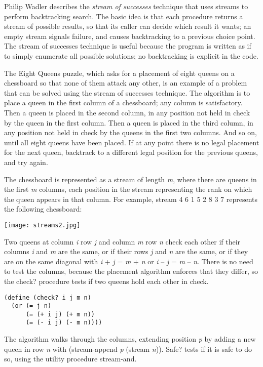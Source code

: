 Philip Wadler describes the \emph{stream of successes} technique that
uses streams to perform backtracking search. The basic idea is that each
procedure returns a stream of possible results, so that its caller can
decide which result it wants; an empty stream signals failure, and
causes backtracking to a previous choice point. The stream of successes
technique is useful because the program is written as if to simply
enumerate all possible solutions; no backtracking is explicit in the
code.

The Eight Queens puzzle, which asks for a placement of eight queens on a
chessboard so that none of them attack any other, is an example of a
problem that can be solved using the stream of successes technique. The
algorithm is to place a queen in the first column of a chessboard; any
column is satisfactory. Then a queen is placed in the second column, in
any position not held in check by the queen in the first column. Then a
queen is placed in the third column, in any position not held in check
by the queens in the first two columns. And so on, until all eight
queens have been placed. If at any point there is no legal placement for
the next queen, backtrack to a different legal position for the previous
queens, and try again.

The chessboard is represented as a stream of length \emph{m}, where
there are queens in the first \emph{m} columns, each position in the
stream representing the rank on which the queen appears in that column.
For example, stream 4 6 1 5 2 8 3 7 represents the following chessboard:

\texttt{[image: streams2.jpg]}

Two queens at column \emph{i} row \emph{j} and column \emph{m} row
\emph{n} check each other if their columns \emph{i} and \emph{m} are the
same, or if their rows \emph{j} and \emph{n} are the same, or if they
are on the same diagonal with \emph{i} + \emph{j} = \emph{m} + \emph{n}
or \emph{i} -- \emph{j} = \emph{m} -- \emph{n}. There is no need to test
the columns, because the placement algorithm enforces that they differ,
so the check? procedure tests if two queens hold each other in check.

\begin{verbatim}
(define (check? i j m n)
  (or (= j n)
      (= (+ i j) (+ m n))
      (= (- i j) (- m n))))
\end{verbatim}

The algorithm walks through the columns, extending position \emph{p} by
adding a new queen in row \emph{n} with (stream-append \emph{p} (stream
\emph{n})). Safe? tests if it is safe to do so, using the utility
procedure stream-and.

